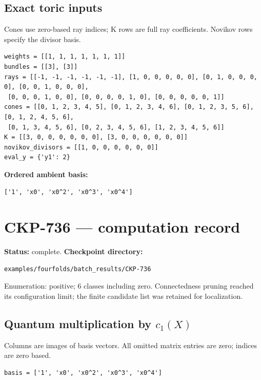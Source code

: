 \documentclass[10pt,a4paper]{article}
\begin{document}
\subsection*{Exact toric inputs}
Cones use zero-based ray indices; K rows are full ray coefficients. Novikov rows specify the divisor basis.

\begin{lstlisting}
weights = [[1, 1, 1, 1, 1, 1, 1]]
bundles = [[3], [3]]
rays = [[-1, -1, -1, -1, -1, -1], [1, 0, 0, 0, 0, 0], [0, 1, 0, 0, 0, 0], [0, 0, 1, 0, 0, 0],
 [0, 0, 0, 1, 0, 0], [0, 0, 0, 0, 1, 0], [0, 0, 0, 0, 0, 1]]
cones = [[0, 1, 2, 3, 4, 5], [0, 1, 2, 3, 4, 6], [0, 1, 2, 3, 5, 6], [0, 1, 2, 4, 5, 6],
 [0, 1, 3, 4, 5, 6], [0, 2, 3, 4, 5, 6], [1, 2, 3, 4, 5, 6]]
K = [[3, 0, 0, 0, 0, 0, 0], [3, 0, 0, 0, 0, 0, 0]]
novikov_divisors = [[1, 0, 0, 0, 0, 0, 0]]
eval_y = {'y1': 2}
\end{lstlisting}

\textbf{Ordered ambient basis:}
\begin{lstlisting}
['1', 'x0', 'x0^2', 'x0^3', 'x0^4']
\end{lstlisting}

\clearpage\section*{CKP-736 --- computation record}
\textbf{Status:} complete.
\textbf{Checkpoint directory:}
\begin{lstlisting}
examples/fourfolds/batch_results/CKP-736
\end{lstlisting}

Enumeration: positive; 6 classes including zero.
Connectedness pruning reached its configuration limit; the finite candidate list was retained for localization.
\subsection*{Quantum multiplication by $c_1(X)$}
Columns are images of basis vectors. All omitted matrix entries are zero; indices are zero based.

\begin{lstlisting}
basis = ['1', 'x0', 'x0^2', 'x0^3', 'x0^4']
\end{lstlisting}
\end{document}
